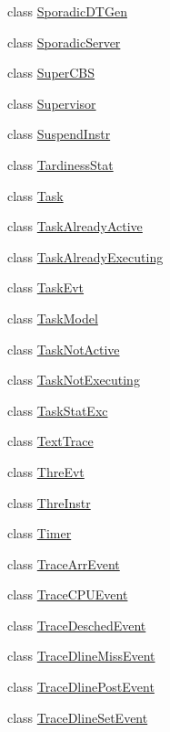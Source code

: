 \begin{DoxyCompactItemize}
\item 
class \hyperlink{classRTSim_1_1SporadicDTGen}{Sporadic\+D\+T\+Gen}
\item 
class \hyperlink{classRTSim_1_1SporadicServer}{Sporadic\+Server}
\item 
class \hyperlink{classRTSim_1_1SuperCBS}{Super\+C\+BS}
\item 
class \hyperlink{classRTSim_1_1Supervisor}{Supervisor}
\item 
class \hyperlink{classRTSim_1_1SuspendInstr}{Suspend\+Instr}
\item 
class \hyperlink{classRTSim_1_1TardinessStat}{Tardiness\+Stat}
\item 
class \hyperlink{classRTSim_1_1Task}{Task}
\item 
class \hyperlink{classRTSim_1_1TaskAlreadyActive}{Task\+Already\+Active}
\item 
class \hyperlink{classRTSim_1_1TaskAlreadyExecuting}{Task\+Already\+Executing}
\item 
class \hyperlink{classRTSim_1_1TaskEvt}{Task\+Evt}
\item 
class \hyperlink{classRTSim_1_1TaskModel}{Task\+Model}
\item 
class \hyperlink{classRTSim_1_1TaskNotActive}{Task\+Not\+Active}
\item 
class \hyperlink{classRTSim_1_1TaskNotExecuting}{Task\+Not\+Executing}
\item 
class \hyperlink{classRTSim_1_1TaskStatExc}{Task\+Stat\+Exc}
\item 
class \hyperlink{classRTSim_1_1TextTrace}{Text\+Trace}
\item 
class \hyperlink{classRTSim_1_1ThreEvt}{Thre\+Evt}
\item 
class \hyperlink{classRTSim_1_1ThreInstr}{Thre\+Instr}
\item 
class \hyperlink{classRTSim_1_1Timer}{Timer}
\item 
class \hyperlink{classRTSim_1_1TraceArrEvent}{Trace\+Arr\+Event}
\item 
class \hyperlink{classRTSim_1_1TraceCPUEvent}{Trace\+C\+P\+U\+Event}
\item 
class \hyperlink{classRTSim_1_1TraceDeschedEvent}{Trace\+Desched\+Event}
\item 
class \hyperlink{classRTSim_1_1TraceDlineMissEvent}{Trace\+Dline\+Miss\+Event}
\item 
class \hyperlink{classRTSim_1_1TraceDlinePostEvent}{Trace\+Dline\+Post\+Event}
\item 
class \hyperlink{classRTSim_1_1TraceDlineSetEvent}{Trace\+Dline\+Set\+Event}

\end{DoxyCompactItemize}
